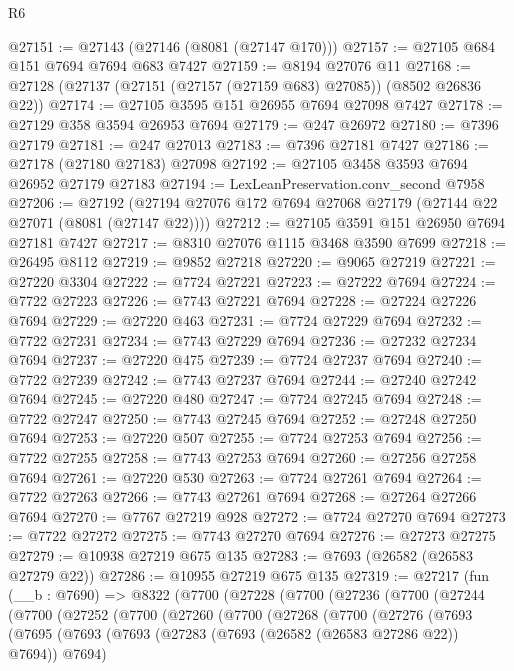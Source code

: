 \begin{lexlean}{R6}
\begin{coremodule}
@27151 := @27143 (@27146 (@8081 (@27147 @170)))
@27157 := @27105 @684 @151 @7694 @7694 @683 @7427
@27159 := @8194 @27076 @11
@27168 := @27128 (@27137 (@27151 (@27157 (@27159 @683) @27085)) (@8502 @26836 @22))
@27174 := @27105 @3595 @151 @26955 @7694 @27098 @7427
@27178 := @27129 @358 @3594 @26953 @7694
@27179 := @247 @26972
@27180 := @7396 @27179
@27181 := @247 @27013
@27183 := @7396 @27181 @7427
@27186 := @27178 (@27180 @27183) @27098
@27192 := @27105 @3458 @3593 @7694 @26952 @27179 @27183
@27194 := LexLeanPreservation.conv_second @7958
@27206 := @27192 (@27194 @27076 @172 @7694 @27068 @27179 (@27144 @22 @27071 (@8081 (@27147 @22))))
@27212 := @27105 @3591 @151 @26950 @7694 @27181 @7427
@27217 := @8310 @27076 @1115 @3468 @3590 @7699
@27218 := @26495 @8112
@27219 := @9852 @27218
@27220 := @9065 @27219
@27221 := @27220 @3304
@27222 := @7724 @27221
@27223 := @27222 @7694
@27224 := @7722 @27223
@27226 := @7743 @27221 @7694
@27228 := @27224 @27226 @7694
@27229 := @27220 @463
@27231 := @7724 @27229 @7694
@27232 := @7722 @27231
@27234 := @7743 @27229 @7694
@27236 := @27232 @27234 @7694
@27237 := @27220 @475
@27239 := @7724 @27237 @7694
@27240 := @7722 @27239
@27242 := @7743 @27237 @7694
@27244 := @27240 @27242 @7694
@27245 := @27220 @480
@27247 := @7724 @27245 @7694
@27248 := @7722 @27247
@27250 := @7743 @27245 @7694
@27252 := @27248 @27250 @7694
@27253 := @27220 @507
@27255 := @7724 @27253 @7694
@27256 := @7722 @27255
@27258 := @7743 @27253 @7694
@27260 := @27256 @27258 @7694
@27261 := @27220 @530
@27263 := @7724 @27261 @7694
@27264 := @7722 @27263
@27266 := @7743 @27261 @7694
@27268 := @27264 @27266 @7694
@27270 := @7767 @27219 @928
@27272 := @7724 @27270 @7694
@27273 := @7722 @27272
@27275 := @7743 @27270 @7694
@27276 := @27273 @27275
@27279 := @10938 @27219 @675 @135
@27283 := @7693 (@26582 (@26583 @27279 @22))
@27286 := @10955 @27219 @675 @135
@27319 := @27217
    (fun (__b : @7690) =>
    @8322
      (@7700
        (@27228
          (@7700
            (@27236
              (@7700
                (@27244
                  (@7700
                    (@27252
                      (@7700
                        (@27260
                          (@7700
                            (@27268
                              (@7700
                                (@27276
                                  (@7693
                                    (@7695
                                      (@7693
                                        (@7693
                                          (@27283 (@7693 (@26582 (@26583 @27286 @22)) @7694))
                                          @7694)

\end{coremodule}
\end{lexlean}
